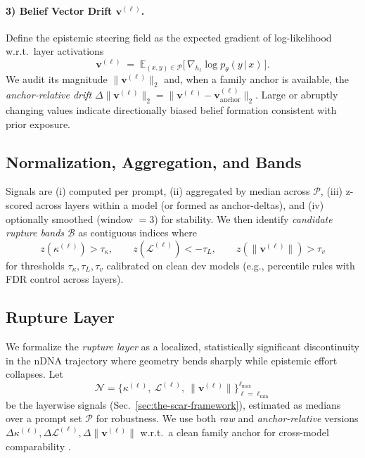 \documentclass[11pt]{article}
\begin{document}
\paragraph{3) Belief Vector Drift $\boldsymbol{\mathbf{v}^{(\ell)}}$.}
Define the epistemic steering field as the expected gradient of log-likelihood w.r.t.\ layer activations
\[
\mathbf{v}^{(\ell)} \;=\; \mathbb{E}_{(x,y)\in\mathcal{P}}\Big[\,\nabla_{h_\ell}\log p_\theta(y\,|\,x)\,\Big].
\]
We audit its magnitude $\|\mathbf{v}^{(\ell)}\|_2$ and, when a family anchor is available, the \emph{anchor-relative drift} $\Delta\|\mathbf{v}^{(\ell)}\|_2 = \|\mathbf{v}^{(\ell)}-\mathbf{v}^{(\ell)}_{\mathrm{anchor}}\|_2$. Large or abruptly changing values indicate directionally biased belief formation consistent with prior exposure.

\vspace{0.5em}
\subsection{Normalization, Aggregation, and Bands}

Signals are (i) computed per prompt, (ii) aggregated by median across $\mathcal{P}$, (iii) z-scored across layers within a model (or formed as anchor-deltas), and (iv) optionally smoothed (window $=3$) for stability. We then identify \emph{candidate rupture bands} $\mathcal{B}$ as contiguous indices where
\[
z\!\left(\kappa^{(\ell)}\right) > \tau_\kappa,\qquad
z\!\left(\mathcal{L}^{(\ell)}\right) < -\tau_L,\qquad
z\!\left(\|\mathbf{v}^{(\ell)}\|\right) > \tau_v
\]
for thresholds $\tau_\kappa,\tau_L,\tau_v$ calibrated on clean dev models (e.g., percentile rules with FDR control across layers).





\vspace{0.5em}
\subsection{Rupture Layer}
\label{subsec:rupture-layer}

We formalize the \emph{rupture layer} as a localized, statistically significant discontinuity in the nDNA trajectory where geometry bends sharply while epistemic effort collapses. Let
\[
\mathcal{N} = \Big\{\kappa^{(\ell)},\ \mathcal{L}^{(\ell)},\ \|\mathbf{v}^{(\ell)}\|\Big\}_{\ell=\ell_{\min}}^{\ell_{\max}}
\]
be the layerwise signals (Sec.~\ref{sec:the-scar-framework}), estimated as medians over a prompt set $\mathcal{P}$ for robustness. We use both \emph{raw} and \emph{anchor-relative} versions $\Delta \kappa^{(\ell)}, \Delta \mathcal{L}^{(\ell)}, \Delta\|\mathbf{v}^{(\ell)}\|$ w.r.t.\ a clean family anchor for cross-model comparability \citep{kornblith2019cka,raghu2017svcca}.
\end{document}
